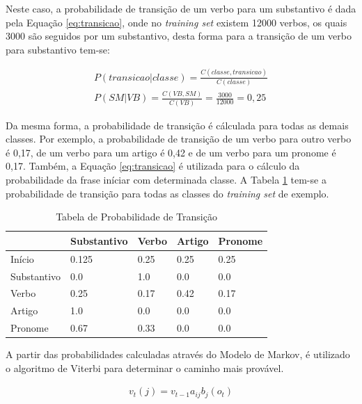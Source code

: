 Neste caso, a probabilidade de transição de um verbo para um substantivo é dada
pela Equação \ref{eq:transicao}, onde no \textit{training set} existem 12000
verbos, os quais 3000 são seguidos por um substantivo, desta forma para a
transição de um verbo para substantivo tem-se:

\begin{equation}
\begin{split}
P(transicao|classe) = \frac{C(classe,transicao)}{C(classe)} \\
P(SM|VB) = \frac{C(VB,SM)}{C(VB)} = \frac{3000}{12000} = 0,25 
\end{split}
\label{eq:transicao}
\end{equation}

Da mesma forma, a probabilidade de transição é cálculada para todas as
demais classes. Por exemplo, a probabilidade de
transição de um verbo para outro verbo é 0,17, de um verbo para um artigo é 0,42
e de um verbo para um pronome é 0,17. Também, a Equação \ref{eq:transicao} é
utilizada para o cálculo da probabilidade da frase iníciar com determinada
classe.
A Tabela \ref{tabela:transicao} tem-se a probabilidade de transição para todas
as classes do \textit{training set} de exemplo.

\begin{table}[htb]
\centering
\begin{tabular}{|l|l|l|l|l|}
\hline
& Substantivo & Verbo & Artigo & Pronome \\ \hline
Início      & 0.125       & 0.25  & 0.25   & 0.25    \\ \hline
Substantivo & 0.0         & 1.0   & 0.0    & 0.0     \\ \hline
Verbo       & 0.25        & 0.17  & 0.42   & 0.17    \\ \hline
Artigo      & 1.0         & 0.0   & 0.0    & 0.0     \\ \hline
Pronome     & 0.67        & 0.33  & 0.0    & 0.0     \\ \hline
\end{tabular}
\caption{Tabela de Probabilidade de Transição}
\label{tabela:transicao}
\end{table}

A partir das probabilidades calculadas através do Modelo de Markov, é
utilizado o algoritmo de Viterbi para determinar o caminho mais provável. 

\begin{equation}
\begin{split}
v_t(j) = v_{t-1} a_{ij} b_j(o_t)
\end{split}
\label{eq:viterbi}
\end{equation}

